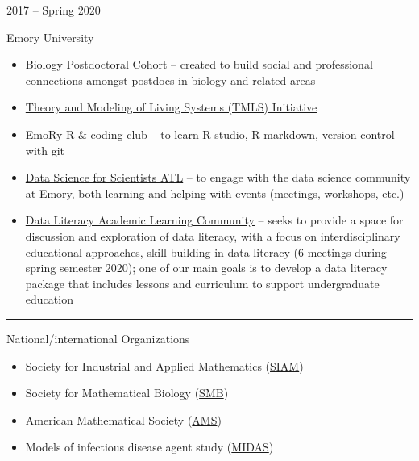 \documentclass[a4paper,10pt]{article}
\newlength{\cvcolumngapwidth}
\newlength{\cvleftcolumnwidth}
\newlength{\cvrightcolumnwidth}
\newcommand{\cvsectionstyle}[1]{{\normalsize\cvsectionfont\textcolor{cvsectioncolor}{#1}}}
\newcommand{\cvtitlestyle}[1]{{\large\cvtitlefont\textcolor{cvtitlecolor}{#1}}}
\newcommand{\cvheadingstyle}[1]{{\normalsize\cvheadingfont\textcolor{cvheadingcolor}{#1}}}
\newlength{\cvafteritemskipamount}
\newlength{\cvaftersectionskipamount}
\newlength{\cvaftertitleskipamount}
\newlength{\cvparskip}
\newcommand{\cvsection}[1]{
            \begin{minipage}[t]{\cvleftcolumnwidth}
                \raggedleft\cvsectionstyle{#1}
            \end{minipage}%
            \hspace{\cvcolumngapwidth}%
            \begin{minipage}[t]{\cvrightcolumnwidth}
                \textcolor{cvrulecolor}{\rule{\cvrightcolumnwidth}{0.3mm}}
            \end{minipage}
        
            \vspace{\cvaftersectionskipamount}
        }
\newcommand{\cvitem}[2]{
            \begin{minipage}[t]{\cvleftcolumnwidth}
                \raggedleft #1
            \end{minipage}%
            \hspace{\cvcolumngapwidth}%
            \begin{minipage}[t]{\cvrightcolumnwidth}
                \setlength{\parskip}{\cvparskip} #2
            \end{minipage}
        
            \vspace{\cvafteritemskipamount}
        }
\newcommand{\cvtitle}[1]{
            \cvtitlestyle{#1}
        
            \vspace{\cvaftertitleskipamount}
            \vspace{-\cvparskip}
        }
\begin{document}
        \cvitem{
            \cvheadingstyle{2017 -- Spring 2020}
        }{
            \cvtitle{Emory University}
            \begin{itemize}[leftmargin=*]
                \item Biology Postdoctoral Cohort -- created to build social and professional connections amongst postdocs in biology and related areas
                \item \href{http://livingtheory.emory.edu/}{Theory and Modeling of Living Systems (TMLS) Initiative}
                \item \href{https://darwinanddavis.github.io/EmoRyCodingClub/index.html}{EmoRy R \& coding club} -- to learn R studio, R markdown, version control with git
                \item \href{https://emory.campuslabs.com/engage/organization/data-science-for-scientists-atl}{Data Science for Scientists ATL} -- to engage with the data science community at Emory, both learning and helping with events (meetings, workshops, etc.) 
                \item \href{http://cfde.emory.edu/news-events/news/2019/november/data-literacy-alc.html}{Data Literacy Academic Learning Community} -- seeks to provide a space for discussion and exploration of data literacy, with a focus on interdisciplinary educational approaches, skill-building in data literacy (6 meetings during spring semester 2020); one of our main goals is to develop a data literacy package that includes lessons and curriculum to support undergraduate education
            \end{itemize}
        }
        
        
        \cvsection{CURRENT PROFESSIONAL MEMBERSHIPS}
        
        \cvitem{
            \cvheadingstyle{}
        }{
            \cvtitle{National/international Organizations}
            \begin{itemize}[leftmargin=*]
                \item Society for Industrial and Applied Mathematics (\href{https://www.siam.org/}{SIAM}) 
            	\item Society for Mathematical Biology (\href{https://www.smb.org/}{SMB})
                \item American Mathematical Society (\href{https://www.ams.org/home/page}{AMS})
                \item Models of infectious disease agent study (\href{https://midasnetwork.us/}{MIDAS})
            \end{itemize}
            
        }
        
\end{document}
